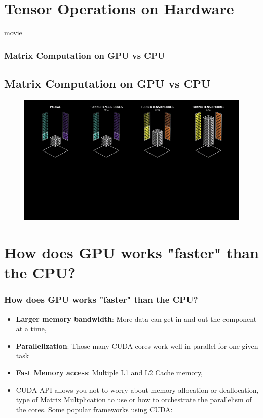 \documentclass[11pt]{beamer}
\begin{document}
\section{Tensor Operations on Hardware}
\begin{frame}{movie}
	\frametitle{Matrix Computation on GPU vs CPU}
	\subsection{Matrix Computation on GPU vs CPU}
	\begin{figure}[h!]
	\centering
	{\includegraphics[width=1.0\textwidth]{gpugif.png}}
	\end{figure}
\end{frame}

\section{How does GPU works "faster" than the CPU?}
\begin{frame}
	\frametitle{How does GPU works "faster" than the CPU?}
	\begin{itemize}
		\item \textbf{Larger memory bandwidth}: More data can get in and out the component at a time,
		\item \textbf{Parallelization}: Those many CUDA cores work well in parallel for one given task
		\item \textbf{Fast Memory access}: Multiple L1 and L2 Cache memory,
		\item CUDA API allows you not to worry about memory allocation or deallocation, type of Matrix Multplication to use or how to orchestrate the parallelism of the cores. Some popular frameworks using CUDA:
	\end{itemize}
\end{frame}
\end{document}
